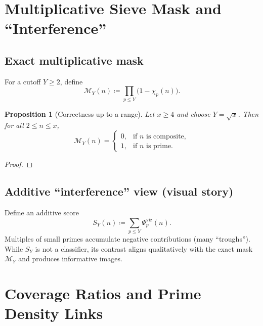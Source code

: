 \documentclass[reprint,amsmath,amssymb,aps,pra]{revtex4-2}
\newtheorem{proposition}{Proposition}
\newcommand{\W}{\Psi}                         %
\begin{document}
\section{Multiplicative Sieve Mask and “Interference”}

\subsection{Exact multiplicative mask}
For a cutoff $Y\ge 2$, define
\begin{equation}
\mathcal{M}_Y(n) \coloneqq \prod_{p\le Y}\bigl(1-\chi_p(n)\bigr).
\label{eq:mask}
\end{equation}
\begin{proposition}[Correctness up to a range]
Let $x\ge 4$ and choose $Y=\sqrt{x}$. Then for all $2\le n\le x$,
\[
\mathcal{M}_Y(n)=
\begin{cases}
0, & \text{if $n$ is composite},\\
1, & \text{if $n$ is prime.}
\end{cases}
\]
\end{proposition}
\begin{proof}
\end{proof}

\subsection{Additive “interference” view (visual story)}
Define an additive score
\begin{equation}
S_Y(n)\coloneqq \sum_{p\le Y}\W^{\mathrm{viz}}_p(n).
\end{equation}
Multiples of small primes accumulate negative contributions (many “troughs”). While $S_Y$ is not a classifier, its contrast aligns qualitatively with the exact mask $\mathcal{M}_Y$ and produces informative images.

\section{Coverage Ratios and Prime Density Links}
\end{document}
